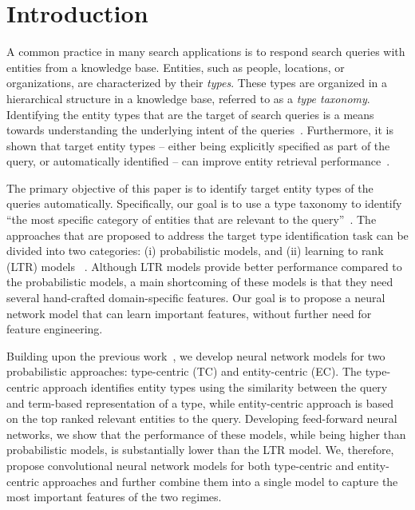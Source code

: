 \section{Introduction}\label{introduction}
\par
A common practice in many search applications is to respond search queries with entities from a knowledge base. Entities, such as people, locations, or organizations, are characterized by their \emph{types}. These types are organized in a hierarchical structure in a knowledge base, referred to as a \emph{type taxonomy}. 
Identifying the entity types that are the target of search queries is a means towards understanding the underlying intent of the queries~\citep{Balog:2018:EOS}.  Furthermore, it is shown that target entity types -- either being explicitly specified as part of the query, or automatically identified -- can improve entity retrieval performance~\citep{Garigliotti:2018:IET, Balog:2011:QME:2037661.2037667, Kaptein:2013:ECS:2405838.2405908, pehcevski2010entity}. 


The primary objective of this paper is to identify target entity types of the queries automatically. Specifically, our goal is to use a type taxonomy to identify ``the most specific category of entities that are relevant to the query''~\citep{Garigliotti:2017:TTI:3077136.3080659}.
The approaches that are proposed to address the target type identification task can be  divided into two categories: (i) probabilistic models, and (ii) learning to rank (LTR) models ~\citep{Garigliotti:2017:TTI:3077136.3080659, Garigliotti:2018:IET}. 	Although LTR models provide better performance compared to the probabilistic models, a main shortcoming of these models is that they need several hand-crafted domain-specific features. Our goal is to propose a neural network model that can learn important features, without further need for feature engineering.


Building upon the previous work~\citep{Garigliotti:2017:TTI:3077136.3080659}, we develop neural network models for two probabilistic approaches: type-centric (TC) and entity-centric (EC). The type-centric approach identifies entity types using the similarity between the query and term-based representation of a type, while entity-centric approach is based on the top ranked relevant entities to the query. Developing feed-forward neural networks, we show that the performance of these models, while being higher than probabilistic models, is substantially lower than the LTR model. We, therefore, propose convolutional neural network models for  both type-centric and entity-centric approaches and further combine them into a single model to capture the most important features of the two regimes.


